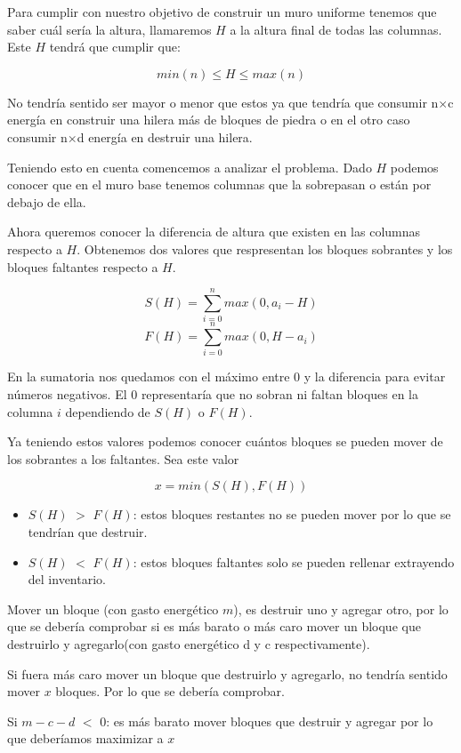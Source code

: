 \documentclass[a4paper,12pt]{article}
\begin{document}
Para cumplir con nuestro objetivo de construir un muro uniforme tenemos que saber cuál sería la altura, llamaremos \(H\) a la altura final de todas las columnas.
Este \(H\) tendrá que cumplir que:

\[min(n) \leq H \leq max(n)\]

No tendría sentido ser mayor o menor que estos ya que tendría que consumir n$\times$c energía en construir una hilera más de bloques de piedra o en el otro caso consumir n$\times$d energía en destruir una hilera.

Teniendo esto en cuenta comencemos a analizar el problema.
Dado \(H\) podemos conocer que en el muro base tenemos columnas que la sobrepasan o están por debajo de ella.

Ahora queremos conocer la diferencia de altura que existen en las columnas respecto a \(H\). Obtenemos dos valores que respresentan los bloques sobrantes y los bloques faltantes respecto a \(H\).

\[S(H) = \sum_{i=0}^{n} max(0,a_i - H)\]
\[F(H) = \sum_{i=0}^{n} max(0,H - a_i)\]

En la sumatoria nos quedamos con el máximo entre 0 y la diferencia para evitar números negativos. El 0 representaría que no sobran ni faltan bloques en la columna \(i\) dependiendo de \(S(H)\) o \(F(H)\).

Ya teniendo estos valores podemos conocer cuántos bloques se pueden mover de los sobrantes a los faltantes. Sea este valor

\[x=min(S(H),F(H))\]

\begin{itemize}
	\item \(S(H)\) $>$ \(F(H)\): estos bloques restantes no se pueden mover por lo que se tendrían que destruir.
	\item \(S(H)\) $<$ \(F(H)\): estos bloques faltantes solo se pueden rellenar extrayendo del inventario.
\end{itemize}

Mover un bloque (con gasto energético \(m\)), es destruir uno y agregar otro, por lo que se debería comprobar si es más barato o más caro mover un bloque que destruirlo y agregarlo(con gasto energético d y c respectivamente).

Si fuera más caro mover un bloque que destruirlo y agregarlo, no tendría sentido mover \(x\) bloques. Por lo que se debería comprobar.

Si \(m - c - d \) $<$ \(0\): es más barato mover bloques que destruir y agregar por lo que deberíamos maximizar a \(x\)
\end{document}

